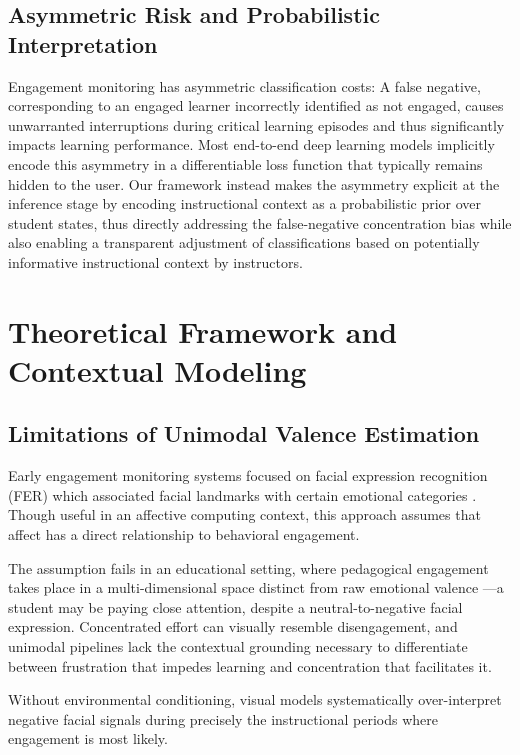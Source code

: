 \documentclass[conference]{IEEEtran}
\begin{document}
\subsection{Asymmetric Risk and Probabilistic Interpretation}
Engagement monitoring has asymmetric classification costs: A false negative, corresponding to an engaged learner incorrectly identified as not engaged, causes unwarranted interruptions during critical learning episodes and thus significantly impacts learning performance. Most end-to-end deep learning models implicitly encode this asymmetry in a differentiable loss function that typically remains hidden to the user. Our framework instead makes the asymmetry explicit at the inference stage by encoding instructional context as a probabilistic prior over student states, thus directly addressing the false-negative concentration bias while also enabling a transparent adjustment of classifications based on potentially informative instructional context by instructors.

\section{Theoretical Framework and Contextual Modeling}

\subsection{Limitations of Unimodal Valence Estimation}
Early engagement monitoring systems focused on facial expression recognition (FER) which associated facial landmarks with certain emotional categories \cite{b2}. Though useful in an affective computing context, this approach assumes that affect has a direct relationship to behavioral engagement.

The assumption fails in an educational setting, where pedagogical engagement takes place in a multi-dimensional space distinct from raw emotional valence \cite{b7}---a student may be paying close attention, despite a neutral-to-negative facial expression. Concentrated effort can visually resemble disengagement, and unimodal pipelines lack the contextual grounding necessary to differentiate between frustration that impedes learning and concentration that facilitates it.

Without environmental conditioning, visual models systematically over-interpret negative facial signals during precisely the instructional periods where engagement is most likely.
\end{document}
